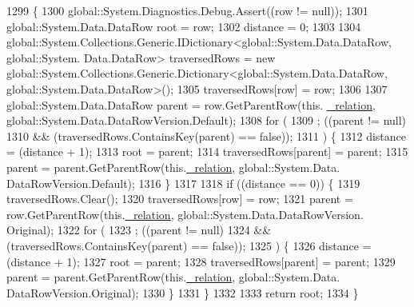 \begin{DoxyCode}
1299                                                                                                        \{
1300                 global::System.Diagnostics.Debug.Assert((row != null));
1301                 global::System.Data.DataRow root = row;
1302                 distance = 0;
1303 
1304                 global::System.Collections.Generic.IDictionary<global::System.Data.DataRow, global::System.
      Data.DataRow> traversedRows = \textcolor{keyword}{new} global::System.Collections.Generic.Dictionary<global::System.Data.DataRow,
       global::System.Data.DataRow>();
1305                 traversedRows[row] = row;
1306 
1307                 global::System.Data.DataRow parent = row.GetParentRow(this.
      \hyperlink{class_proyecto___integrador__3_1_1ds_unidad_table_adapters_1_1_table_adapter_manager_1_1_self_reference_comparer_a38933c9fc07338f9d73c729181d3b020}{\_relation}, global::System.Data.DataRowVersion.Default);
1308                 \textcolor{keywordflow}{for} (
1309                 ; ((parent != null) 
1310                             && (traversedRows.ContainsKey(parent) == \textcolor{keyword}{false})); 
1311                 ) \{
1312                     distance = (distance + 1);
1313                     root = parent;
1314                     traversedRows[parent] = parent;
1315                     parent = parent.GetParentRow(this.\hyperlink{class_proyecto___integrador__3_1_1ds_unidad_table_adapters_1_1_table_adapter_manager_1_1_self_reference_comparer_a38933c9fc07338f9d73c729181d3b020}{\_relation}, global::System.Data.
      DataRowVersion.Default);
1316                 \}
1317 
1318                 \textcolor{keywordflow}{if} ((distance == 0)) \{
1319                     traversedRows.Clear();
1320                     traversedRows[row] = row;
1321                     parent = row.GetParentRow(this.\hyperlink{class_proyecto___integrador__3_1_1ds_unidad_table_adapters_1_1_table_adapter_manager_1_1_self_reference_comparer_a38933c9fc07338f9d73c729181d3b020}{\_relation}, global::System.Data.DataRowVersion.
      Original);
1322                     \textcolor{keywordflow}{for} (
1323                     ; ((parent != null) 
1324                                 && (traversedRows.ContainsKey(parent) == \textcolor{keyword}{false})); 
1325                     ) \{
1326                         distance = (distance + 1);
1327                         root = parent;
1328                         traversedRows[parent] = parent;
1329                         parent = parent.GetParentRow(this.\hyperlink{class_proyecto___integrador__3_1_1ds_unidad_table_adapters_1_1_table_adapter_manager_1_1_self_reference_comparer_a38933c9fc07338f9d73c729181d3b020}{\_relation}, global::System.Data.
      DataRowVersion.Original);
1330                     \}
1331                 \}
1332 
1333                 \textcolor{keywordflow}{return} root;
1334             \}
\end{DoxyCode}


